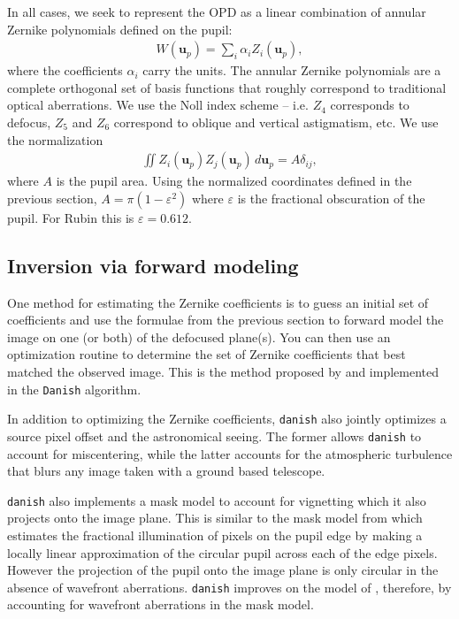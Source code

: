 \documentclass[TS,authoryear,toc]{lsstdoc}
\begin{document}
In all cases, we seek to represent the OPD as a linear combination of annular Zernike polynomials defined on the pupil:
\begin{align}
    W(\mathbf{u}_p) = \sum_i \alpha_i Z_i(\mathbf{u}_p), 
\end{align}
where the coefficients $\alpha_i$ carry the units.
The annular Zernike polynomials are a complete orthogonal set of basis functions that roughly correspond to traditional optical aberrations.
We use the Noll index scheme -- i.e. $Z_4$ corresponds to defocus, $Z_5$ and $Z_6$ correspond to oblique and vertical astigmatism, etc.
We use the normalization
\begin{align}
    \iint Z_i(\mathbf{u}_p) Z_j(\mathbf{u}_p) \, d \mathbf{u}_p = A \delta_{ij},
    \label{eq:norm}
\end{align}
where $A$ is the pupil area.
Using the normalized coordinates defined in the previous section, $A = \pi (1 - \varepsilon^2)$ where $\varepsilon$ is the fractional obscuration of the pupil.
For Rubin this is $\varepsilon = 0.612$.

\subsection{Inversion via forward modeling}

One method for estimating the Zernike coefficients is to guess an initial set of coefficients and use the formulae from the previous section to forward model the image on one (or both) of the defocused plane(s).
You can then use an optimization routine to determine the set of Zernike coefficients that best matched the observed image.
This is the method proposed by \citet{janish2012} and implemented in the \texttt{Danish} algorithm.

In addition to optimizing the Zernike coefficients, \texttt{danish} also jointly optimizes a source pixel offset and the astronomical seeing.
The former allows \texttt{danish} to account for miscentering, while the latter accounts for the atmospheric turbulence that blurs any image taken with a ground based telescope.

\texttt{danish} also implements a mask model to account for vignetting which it also projects onto the image plane.
This is similar to the mask model from \citet{janish2012} which estimates the fractional illumination of pixels on the pupil edge by making a locally linear approximation of the circular pupil across each of the edge pixels.
However the projection of the pupil onto the image plane is only circular in the absence of wavefront aberrations.
\texttt{danish} improves on the model of \citet{janish2012}, therefore, by accounting for wavefront aberrations in the mask model.
\end{document}
